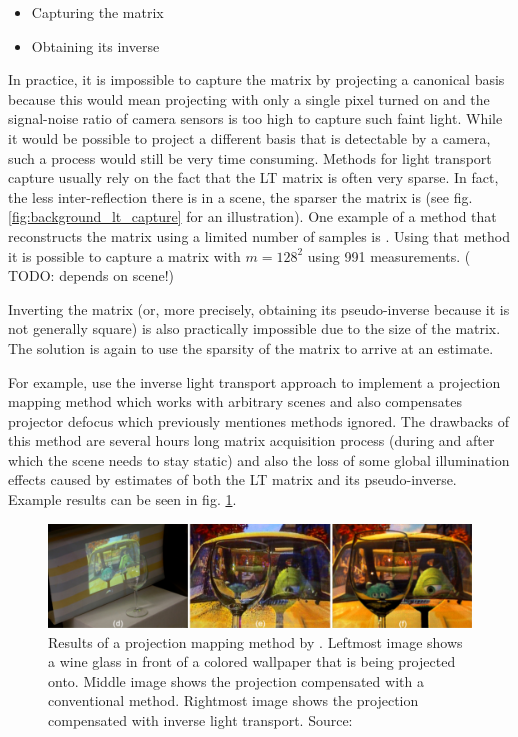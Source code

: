 \begin{itemize}
    \item Capturing the matrix
    \item Obtaining its inverse
\end{itemize}

In practice, it is impossible to capture the matrix by projecting a canonical basis because this would mean projecting with only a single pixel turned on and the signal-noise ratio of camera sensors is too high to capture such faint light. While it would be possible to project a different basis that is detectable by a camera, such a process would still be very time consuming. Methods for light transport capture usually rely on the fact that the LT matrix is often very sparse. In fact, the less inter-reflection there is in a scene, the sparser the matrix is (see fig. \ref{fig:background_lt_capture} for an illustration). One example of a method that reconstructs the matrix using a limited number of samples is \citet{Peers2009}. Using that method it is possible to capture a matrix with \(m = 128^2\) using 991 measurements. ({\color{red} TODO: depends on scene!})

Inverting the matrix (or, more precisely, obtaining its pseudo-inverse because it is not generally square) is also practically impossible due to the size of the matrix. The solution is again to use the sparsity of the matrix to arrive at an estimate.

For example, \citet{Wetzstein2007} use the inverse light transport approach to implement a projection mapping method which works with arbitrary scenes and also compensates projector defocus which previously mentiones methods ignored. The drawbacks of this method are several hours long matrix acquisition process (during and after which the scene needs to stay static) and also the loss of some global illumination effects caused by estimates of both the LT matrix and its pseudo-inverse. Example results can be seen in fig. \ref{fig:background_wetzstein_result}.

\begin{figure}[ht]
    \centering
    \includegraphics[width=\textwidth]{images/02-wetzstein_result_crop_compressed.jpg}
    \caption{Results of a projection mapping method by \citet{Wetzstein2007}. Leftmost image shows a wine glass in front of a colored wallpaper that is being projected onto. Middle image shows the projection compensated with a conventional method. Rightmost image shows the projection compensated with inverse light transport. Source: \citet{Wetzstein2007}}
    \label{fig:background_wetzstein_result}
\end{figure}

